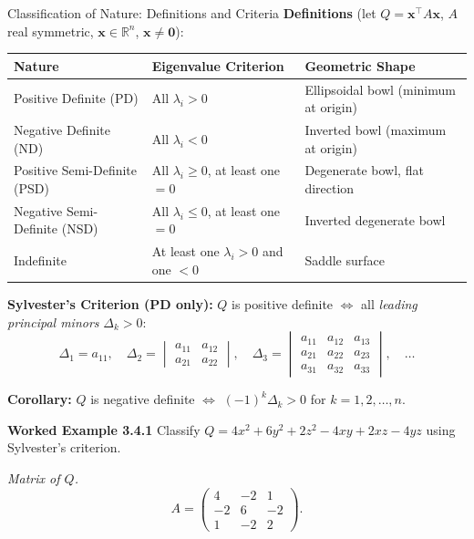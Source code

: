 \documentclass[12pt,a4paper]{article}
\begin{document}
\begin{infobox}{Classification of Nature: Definitions and Criteria}
\textbf{Definitions} (let $Q = \mathbf{x}^{\top}A\mathbf{x}$, $A$ real symmetric, $\mathbf{x} \in \mathbb{R}^{n}$, $\mathbf{x}\neq\mathbf{0}$):

\begin{center}
\begin{tabular}{@{}lll@{}}
\toprule
Nature & Eigenvalue Criterion & Geometric Shape \\
\midrule
Positive Definite (PD)       & All $\lambda_i > 0$     & Ellipsoidal bowl (minimum at origin) \\
Negative Definite (ND)       & All $\lambda_i < 0$     & Inverted bowl (maximum at origin) \\
Positive Semi-Definite (PSD) & All $\lambda_i \geq 0$, at least one $= 0$ & Degenerate bowl, flat direction \\
Negative Semi-Definite (NSD) & All $\lambda_i \leq 0$, at least one $= 0$ & Inverted degenerate bowl \\
Indefinite                   & At least one $\lambda_i > 0$ and one $< 0$ & Saddle surface \\
\bottomrule
\end{tabular}
\end{center}

\textbf{Sylvester's Criterion (PD only):} $Q$ is positive definite $\iff$ all \emph{leading principal minors} $\Delta_k > 0$:
\[
  \Delta_1 = a_{11},\quad
  \Delta_2 = \begin{vmatrix} a_{11}&a_{12}\\a_{21}&a_{22}\end{vmatrix},\quad
  \Delta_3 = \begin{vmatrix} a_{11}&a_{12}&a_{13}\\a_{21}&a_{22}&a_{23}\\a_{31}&a_{32}&a_{33}\end{vmatrix}, \quad \ldots
\]

\textbf{Corollary:} $Q$ is negative definite $\iff$ $(-1)^{k}\Delta_k > 0$ for $k=1,2,\ldots,n$.
\end{infobox}

\textbf{Worked Example 3.4.1} Classify $Q = 4x^{2} + 6y^{2} + 2z^{2} - 4xy + 2xz - 4yz$ using Sylvester's criterion.

\textit{Matrix of $Q$.}
\[
A = \begin{pmatrix} 4 & -2 & 1 \\ -2 & 6 & -2 \\ 1 & -2 & 2 \end{pmatrix}.
\]
\end{document}
